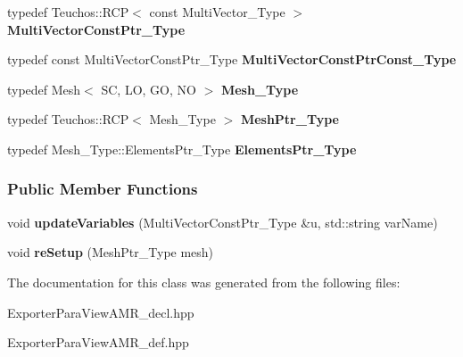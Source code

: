 \begin{DoxyCompactItemize}
typedef Teuchos\+::\+R\+CP$<$ const Multi\+Vector\+\_\+\+Type $>$ {\bfseries Multi\+Vector\+Const\+Ptr\+\_\+\+Type}
\item 
\mbox{\label{classFEDD_1_1ExporterParaViewAMR_a5c223e7593c38a53e11908ef7ee63a98}} 
typedef const Multi\+Vector\+Const\+Ptr\+\_\+\+Type {\bfseries Multi\+Vector\+Const\+Ptr\+Const\+\_\+\+Type}
\item 
\mbox{\label{classFEDD_1_1ExporterParaViewAMR_a1e469aabe3952e2cd5797236ba2d80b7}} 
typedef Mesh$<$ SC, LO, GO, NO $>$ {\bfseries Mesh\+\_\+\+Type}
\item 
\mbox{\label{classFEDD_1_1ExporterParaViewAMR_a5e139c70ffeb95aaa46d5d2dc64e20c7}} 
typedef Teuchos\+::\+R\+CP$<$ Mesh\+\_\+\+Type $>$ {\bfseries Mesh\+Ptr\+\_\+\+Type}
\item 
\mbox{\label{classFEDD_1_1ExporterParaViewAMR_a6a376912bffdf1fcd740ffd7c6db719f}} 
typedef Mesh\+\_\+\+Type\+::\+Elements\+Ptr\+\_\+\+Type {\bfseries Elements\+Ptr\+\_\+\+Type}
\end{DoxyCompactItemize}
\subsubsection*{Public Member Functions}
\begin{DoxyCompactItemize}
\item 
\mbox{\label{classFEDD_1_1ExporterParaViewAMR_a1c1672caa0d613c1d273089a9758f2ea}} 
void {\bfseries update\+Variables} (Multi\+Vector\+Const\+Ptr\+\_\+\+Type \&u, std\+::string var\+Name)
\item 
\mbox{\label{classFEDD_1_1ExporterParaViewAMR_a7147bdcbe93d3157b0717a82e8776ea5}} 
void {\bfseries re\+Setup} (Mesh\+Ptr\+\_\+\+Type mesh)
\end{DoxyCompactItemize}


The documentation for this class was generated from the following files\+:\begin{DoxyCompactItemize}
\item 
Exporter\+Para\+View\+A\+M\+R\+\_\+decl.\+hpp\item 
Exporter\+Para\+View\+A\+M\+R\+\_\+def.\+hpp\end{DoxyCompactItemize}
